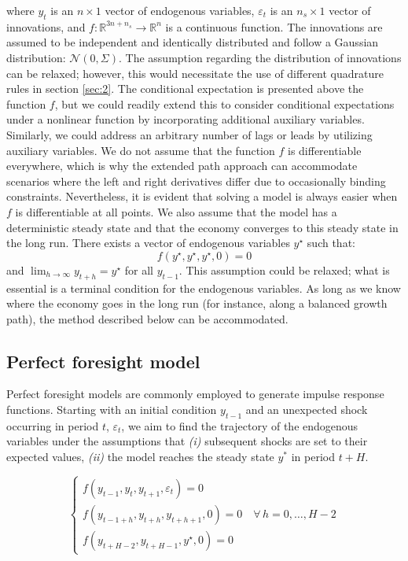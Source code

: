 \documentclass[a4paper,12pt]{amsart}
\begin{document}
where \( y_t \) is an \( n \times 1 \) vector of endogenous
variables, \( \varepsilon_t \) is an \( n_s \times 1 \) vector of
innovations, and \( f: \mathbb R^{3n+n_s} \rightarrow \mathbb R^n \)
is a continuous function. The innovations are assumed to be
independent and identically distributed and follow a Gaussian
distribution: \( \mathcal N(0,\Sigma) \). The assumption regarding the
distribution of innovations can be relaxed; however, this would
necessitate the use of different quadrature rules in section
\ref{sec:2}. The conditional expectation is presented above the
function $f$, but we could readily extend this to consider conditional
expectations under a nonlinear function by incorporating additional
auxiliary variables. Similarly, we could address an arbitrary number
of lags or leads by utilizing auxiliary variables. We do not assume
that the function \(f\) is differentiable everywhere, which is why the
extended path approach can accommodate scenarios where the left and
right derivatives differ due to occasionally binding
constraints. Nevertheless, it is evident that solving a model is
always easier when \(f\) is differentiable at all points. We also
assume that the model has a deterministic steady state and that the
economy converges to this steady state in the long run. There exists a
vector of endogenous variables \(y^{\star}\) such that:
\[
   f\left(y^{\star},y^{\star},y^{\star}, 0\right) = 0
\]
and $\lim_{h\rightarrow\infty}y_{t+h} = y^{\star}$ for all $y_{t-1}$.
This assumption could be relaxed; what is essential is a terminal
condition for the endogenous variables. As long as we know where the
economy goes in the long run (for instance, along a balanced growth
path), the method described below can be accommodated.

\subsection{Perfect foresight model}

Perfect foresight models are commonly employed to generate impulse
response functions. Starting with an initial condition \(y_{t-1}\) and
an unexpected shock occurring in period \(t\), \(\varepsilon_t\), we
aim to find the trajectory of the endogenous variables under the
assumptions that \emph{(i)} subsequent shocks are set to their
expected values, \emph{(ii)} the model reaches the steady
state \(y^*\) in period \(t+H\).

\[
   \begin{cases}
      f\left(y_{t-1},y_t,y_{t+1},\varepsilon_t\right) = 0                            \\
      f\left(y_{t-1+h}, y_{t+h}, y_{t+h+1}, 0\right) =0 \quad\forall\, h=0,\dots,H-2 \\
      f\left(y_{t+H-2}, y_{t+H-1}, y^{\star}, 0\right) =0
   \end{cases}
\]
\end{document}
